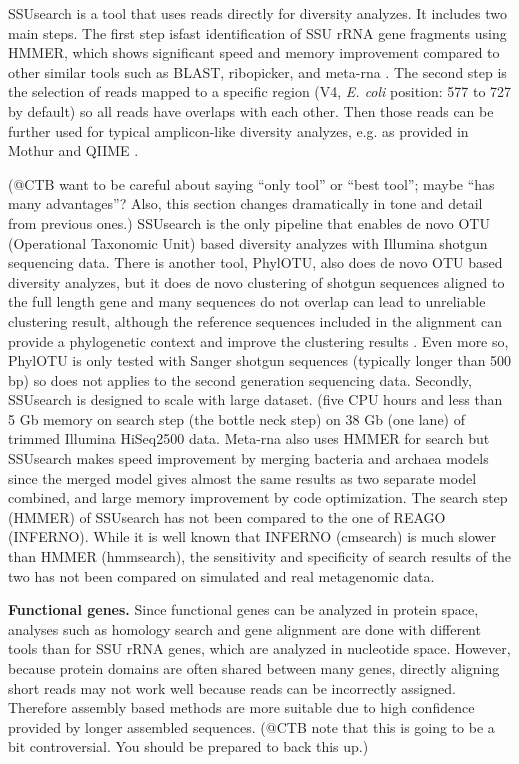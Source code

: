 \documentclass[]{msu-thesis}
\begin{document}
SSUsearch is a tool that uses reads directly for diversity
analyzes. It includes two main steps. The first step isfast
identification of SSU rRNA gene fragments using HMMER, which shows
significant speed and memory improvement compared to other similar
tools such as BLAST, ribopicker, and meta-rna
\cite{altschul_gapped_1997,schmieder_identification_2012,huang_identification_2009}. The
second step is the selection of reads mapped to a specific region (V4,
\textit{E. coli} position: 577 to 727 by default) so all reads have
overlaps with each other. Then those reads can be further used for
typical amplicon-like diversity analyzes, e.g. as provided in Mothur and
QIIME \cite{schloss_introducing_2009,kuczynski_using_2012}.

(@CTB want to be careful about saying ``only tool'' or ``best tool'';
maybe ``has many advantages''? Also, this section changes dramatically
in tone and detail from previous ones.)
SSUsearch is the only pipeline that enables de novo OTU (Operational
Taxonomic Unit) based diversity analyzes with Illumina shotgun
sequencing data. There is another tool, PhylOTU, also does de novo OTU
based diversity analyzes, but it does de novo clustering of shotgun
sequences aligned to the full length gene and many sequences do not
overlap can lead to unreliable clustering result, although the
reference sequences included in the alignment can provide a
phylogenetic context and improve the clustering results
\cite{sharpton_phylotu:_2011}. Even more so, PhylOTU is only tested
with Sanger shotgun sequences (typically longer than 500 bp) so does
not applies to the second generation sequencing data.  Secondly,
SSUsearch is designed to scale with large dataset. (five CPU hours and
less than 5 Gb memory on search step (the bottle neck step) on 38 Gb
(one lane) of trimmed Illumina HiSeq2500 data. Meta-rna
\cite{huang_identification_2009} also uses HMMER for search but
SSUsearch makes speed improvement by merging bacteria and archaea
models since the merged model gives almost the same results as two
separate model combined, and large memory improvement by code
optimization.  The search step (HMMER) of SSUsearch has not been
compared to the one of REAGO (INFERNO). While it is well known that
INFERNO (cmsearch) is much slower than HMMER (hmmsearch), the
sensitivity and specificity of search results of the two has not been
compared on simulated and real metagenomic data.

\textbf{Functional genes.}  Since functional genes can be analyzed in
protein space, analyses such as homology search and gene alignment are
done with different tools than for SSU rRNA genes, which are analyzed
in nucleotide space.  However, because protein domains are often
shared between many genes, directly aligning short reads may not work
well because reads can be incorrectly assigned.  Therefore assembly
based methods are more suitable due to high confidence provided by
longer assembled sequences.
(@CTB note that this is going to be a bit controversial. You should
be prepared to back this up.)
\end{document}
